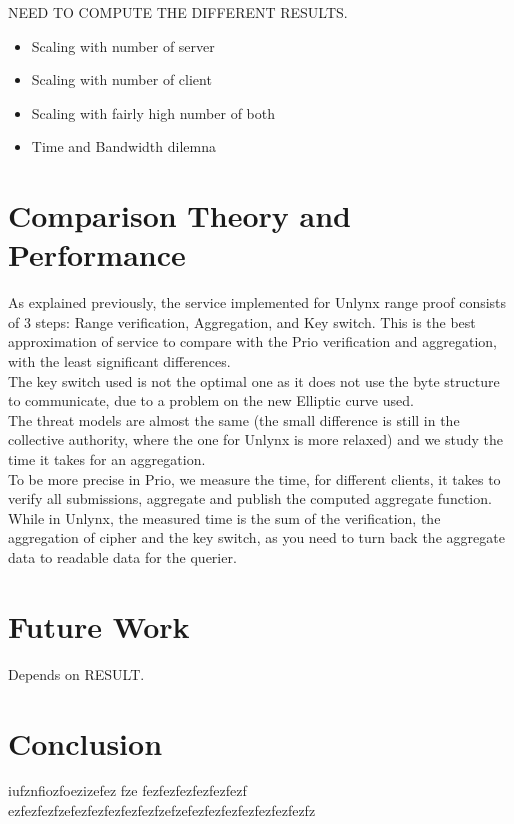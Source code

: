 \documentclass{article}
\begin{document}
NEED TO COMPUTE THE DIFFERENT RESULTS.

\begin{itemize}


\item Scaling with number of server
\item Scaling with number of client
\item Scaling with fairly high number of both 
\item Time and Bandwidth dilemna

\end{itemize}


\section{Comparison Theory and Performance}
As explained previously, the service implemented for Unlynx range proof consists of 3 steps: Range verification, Aggregation, and Key switch. This is the best approximation of service to compare with the Prio verification and aggregation, with the least significant differences.\\
The key switch used is not the optimal one as it does not use the byte structure to communicate, due to a problem on the new Elliptic curve used.\\

The threat models are almost the same (the small difference is still in the collective authority, where the one for Unlynx is more relaxed) and we study the time it takes for an aggregation.\\
To be more precise in Prio, we measure the time, for different clients, it takes to verify all submissions, aggregate and publish the computed aggregate function.
While in Unlynx, the measured time is the sum of the verification, the aggregation of cipher and the key switch, as you need to turn back the aggregate data to readable data for the querier. 

\section{Future Work}
Depends on RESULT.

\newpage
\section*{Conclusion}
iufznfiozfoezizefez fze
fezfezfezfezfezfezf
ezfezfezfzefezfezfezfezfezfzefzefezfezfezfezfezfezfezfz
\end{document}
